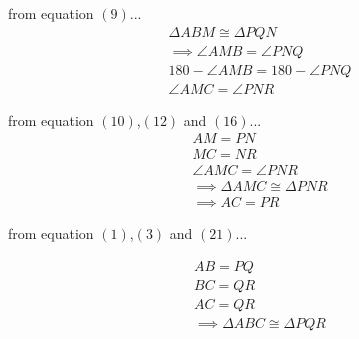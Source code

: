 \documentclass{beamer}
\begin{document}
     \begin{frame}
     		from equation $\left(9\right)$...
     	\begin{align}
     		\Delta ABM \cong \Delta PQN 
     		\\
     		\implies \angle AMB = \angle PNQ
     		\\
     		180 - \angle AMB = 180 -  \angle PNQ
     		\\
     		\angle AMC = \angle PNR
     	\end{align}
     	
     	from equation $\left(10\right)$,$\left(12\right)$ and $\left(16\right)$...
     	\begin{align}
     		AM = PN
     		\\
     		MC = NR
     		\\
     		\angle AMC = \angle PNR
     		\\
     		\implies  \Delta AMC \cong \Delta PNR
     		\\
     		\implies AC = PR
     	\end{align}
     \end{frame}
 
 	\begin{frame}
 		from equation $\left(1\right)$,$\left(3\right)$ and $\left(21\right)$...
 	
 		\begin{align}
 			AB = PQ\\
 			BC = QR\\
 			AC = QR\\
 			\implies  \Delta ABC \cong \Delta PQR
 		\end{align}
 	\end{frame}
\end{document}
